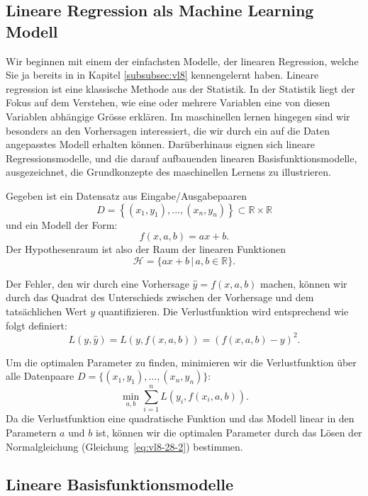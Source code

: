 \subsection{Lineare Regression als Machine Learning Modell}

Wir beginnen mit einem der einfachsten Modelle, der linearen Regression, welche Sie ja bereits in in Kapitel \ref{subsubsec:vl8}
kennengelernt haben. Lineare regression ist eine klassische Methode aus der Statistik. In der Statistik liegt der Fokus auf dem Verstehen, wie eine oder mehrere Variablen eine von diesen Variablen abhängige Grösse erklären. Im maschinellen lernen hingegen sind wir besonders an den Vorhersagen interessiert, die wir durch ein auf die Daten angepasstes Modell erhalten können. 
Darüberhinaus eignen sich lineare Regressionsmodelle, und die darauf aufbauenden linearen Basisfunktionsmodelle, ausgezeichnet, die Grundkonzepte des maschinellen Lernens zu illustrieren. 

Gegeben ist ein Datensatz aus Eingabe/Ausgabepaaren 
\[
    D = \left\{ (x_1,y_1),...,(x_n,y_n) \right\} \subset \mathbb{R} \times \mathbb{R}
\]
und ein Modell der Form:
\[
    f(x, a, b) = ax + b.
\]
Der Hypothesenraum ist also der Raum der linearen Funktionen 
\[
\mathcal{H} = \{a x + b \,| \,a, b \in \mathbb{R}\}.    
\]

Der Fehler, den wir durch eine Vorhersage $\hat{y} =f(x, a, b)$ machen, können wir durch das 
Quadrat des Unterschieds zwischen der Vorhersage und dem tatsächlichen Wert $y$ quantifizieren.
Die Verlustfunktion wird entsprechend wie folgt definiert:
\[
    L(y, \hat{y}) = L(y, f(x, a,b))=  (f(x, a, b) - y)^2.
\]

Um die optimalen Parameter zu finden, minimieren wir die Verlustfunktion über alle Datenpaare $D=\{(x_1, y_1), \ldots, (x_n, y_n)\}$:
\[
    \min_{a, b} \sum_{i=1}^n L(y_i, f(x_i, a, b)).
\]
Da die Verlustfunktion eine quadratische Funktion und das
Modell linear in den Parametern $a$ und $b$ ist, können wir 
die optimalen Parameter durch das Lösen der Normalgleichung (Gleichung~\ref{eq:vl8-28-2}) bestimmen.

\subsection{Lineare Basisfunktionsmodelle}

